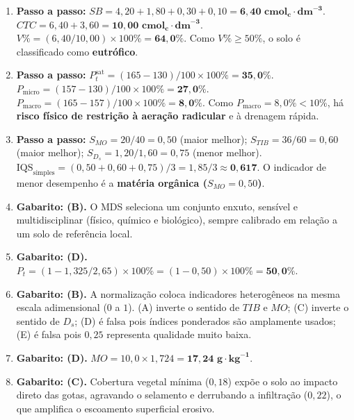 \begin{boxGabarito}
\begin{enumerate}[leftmargin=1.6em, itemsep=4pt]
  Massa de solo: $2.000\text{ m}^3 \times 1{,}30\text{ Mg}\cdot\text{m}^{-3} = 2.600\text{ Mg}\cdot\text{ha}^{-1}$.
  Estoque de carbono: $EC = 2.600 \times 0{,}015 = \mathbf{39{,}00\text{ Mg C}\cdot\text{ha}^{-1}}$.
  \item \textbf{Passo a passo:}
  $SB = 4{,}20 + 1{,}80 + 0{,}30 + 0{,}10 = \mathbf{6{,}40\text{ cmol}_c\cdot\text{dm}^{-3}}$.
  $CTC = 6{,}40 + 3{,}60 = \mathbf{10{,}00\text{ cmol}_c\cdot\text{dm}^{-3}}$.
  $V\% = (6{,}40 / 10{,}00)\times 100\% = \mathbf{64{,}0\%}$. Como $V\% \ge 50\%$, o solo é classificado como \textbf{eutrófico}.
  \item \textbf{Passo a passo:}
  $P_t^{\text{sat}} = (165 - 130)/100 \times 100\% = \mathbf{35{,}0\%}$.
  $P_{\text{micro}} = (157 - 130)/100 \times 100\% = \mathbf{27{,}0\%}$.
  $P_{\text{macro}} = (165 - 157)/100 \times 100\% = \mathbf{8{,}0\%}$.
  Como $P_{\text{macro}} = 8{,}0\% < 10\%$, há \textbf{risco físico de restrição à aeração radicular} e à drenagem rápida.
  \item \textbf{Passo a passo:}
  $S_{MO} = 20 / 40 = 0{,}50$ (maior melhor); $S_{TIB} = 36 / 60 = 0{,}60$ (maior melhor); $S_{D_s} = 1{,}20 / 1{,}60 = 0{,}75$ (menor melhor).
  $\text{IQS}_{\text{simples}} = (0{,}50 + 0{,}60 + 0{,}75) / 3 = 1{,}85 / 3 \approx \mathbf{0{,}617}$.
  O indicador de menor desempenho é a \textbf{matéria orgânica ($S_{MO} = 0{,}50$)}.
  \item \textbf{Gabarito: (B).} O MDS seleciona um conjunto enxuto, sensível e multidisciplinar (físico, químico e biológico), sempre calibrado em relação a um solo de referência local.
  \item \textbf{Gabarito: (D).} $P_t = (1 - 1{,}325 / 2{,}65)\times 100\% = (1 - 0{,}50)\times 100\% = \mathbf{50{,}0\%}$.
  \item \textbf{Gabarito: (B).} A normalização coloca indicadores heterogêneos na mesma escala adimensional ($0$ a $1$). (A) inverte o sentido de $TIB$ e $MO$; (C) inverte o sentido de $D_s$; (D) é falsa pois índices ponderados são amplamente usados; (E) é falsa pois $0{,}25$ representa qualidade muito baixa.
  \item \textbf{Gabarito: (D).} $MO = 10{,}0 \times 1{,}724 = \mathbf{17{,}24\text{ g}\cdot\text{kg}^{-1}}$.
  \item \textbf{Gabarito: (C).} Cobertura vegetal mínima ($0{,}18$) expõe o solo ao impacto direto das gotas, agravando o selamento e derrubando a infiltração ($0{,}22$), o que amplifica o escoamento superficial erosivo.
\end{enumerate}
\end{boxGabarito}

